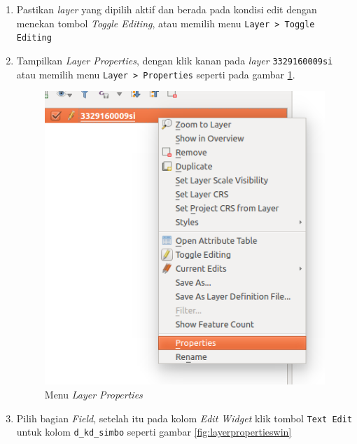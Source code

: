 \begin{enumerate}[1.]

  \item Pastikan \textit{layer} yang dipilih aktif dan berada pada kondisi edit dengan menekan tombol \textit{Toggle Editing}, atau memilih menu \texttt{Layer > Toggle Editing}
  
  \item Tampilkan \textit{Layer Properties}, dengan klik kanan pada \textit{layer} \texttt{3329160009si} atau memilih menu \texttt{Layer > Properties} seperti pada gambar \ref{fig:layerproperties}.
  
  \begin{figure}[H]
    \centering
    \includegraphics[scale=0.7]{./resources/038-layer-properties}
    \caption{Menu \textit{Layer Properties}}
    \label{fig:layerproperties}
  \end{figure}
  
  \item Pilih bagian \textit{Field}, setelah itu pada kolom \textit{Edit Widget} klik tombol \texttt{Text Edit} untuk kolom \texttt{d\_kd\_simbo} seperti gambar \ref{fig:layerpropertieswin}
  

\end{enumerate}
